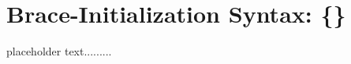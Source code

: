 \newpage
\section[Braced Init]{Brace-Initialization Syntax: {\SecCode \{\}}}\label{bracedinit}


placeholder text.........


